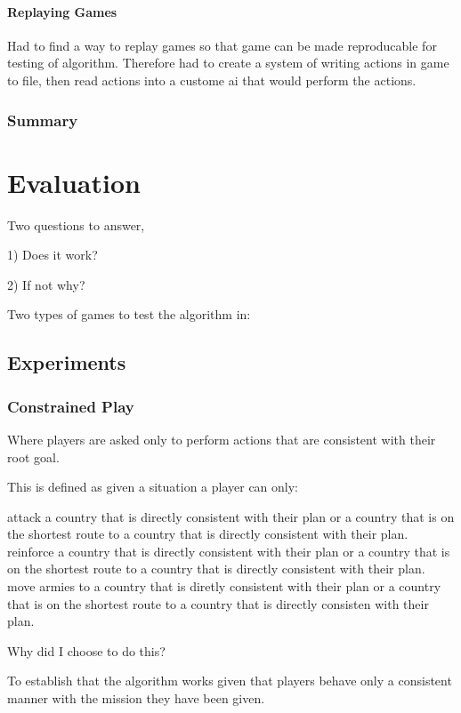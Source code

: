 \documentclass[parskip]{cs4rep}
\begin{document}
\subsubsection{Replaying Games}
Had to find a way to replay games so that game can be made reproducable for testing of algorithm. Therefore had to create a system of writing actions in game to file, then read actions into a custome ai that would perform the actions.

\subsection{Summary}

\chapter{Evaluation}

Two questions to answer, 

1) Does it work?

2) If not why?

Two types of games to test the algorithm in:

\section{Experiments}

\subsection{Constrained Play}

Where players are asked only to perform actions that are consistent with their root goal.

This is defined as given a situation a player can only:

attack a country that is directly consistent with their plan or a country that is on the shortest route to a country that is directly consistent with their plan.
reinforce a country that is directly consistent with their plan or a country that is on the shortest route to a country that is directly consistent with their plan.
move armies to a country that is diretly consistent with their plan or a country that is on the shortest route to a country that is directly consisten with their plan.

Why did I choose to do this?

To establish that the algorithm works given that players behave only a consistent manner with the mission they have been given.
\end{document}
